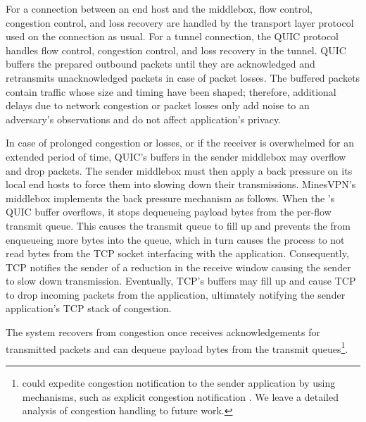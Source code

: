 For a connection between an end host and the middlebox, flow control, congestion
control, and loss recovery are handled by the transport layer protocol used on
the connection as usual.
%
For a tunnel connection, the QUIC protocol handles flow control, congestion
control, and loss recovery in
the tunnel.
QUIC buffers the prepared outbound packets until they are acknowledged and
retransmits unacknowledged packets in case of packet losses. The buffered
packets contain traffic whose size and timing have been shaped; therefore,
additional delays due to network congestion or packet losses only add noise to
an adversary’s observations and do not affect application’s privacy.

In case of prolonged congestion or losses, or if the receiver is overwhelmed for
an extended period of time, QUIC's buffers in the sender middlebox may overflow
and drop packets.
The sender middlebox must then apply a back pressure on its local end hosts to
force them into slowing down their transmissions. MinesVPN’s middlebox
implements the back pressure mechanism as follows. When the {\dshaper}'s QUIC
buffer overflows, it stops dequeueing payload bytes from the per-flow transmit
queue. This causes the transmit queue to fill up and prevents the {\ushaper}
from enqueueing more bytes into the queue, which in turn causes the {\ushaper}
process to not read bytes from the TCP socket interfacing with the application.
Consequently, TCP notifies the sender of a reduction in the receive window
causing the sender to slow down transmission. Eventually, TCP's buffers may fill
up and cause TCP to drop incoming packets from the application, ultimately
notifying the sender application's TCP stack of congestion.

The system recovers from congestion once {\dshaper} receives
acknowledgements for transmitted packets and can dequeue payload
bytes from the transmit queues\footnote{{\sys} could expedite congestion
notification to the sender application by using mechanisms, such as explicit
congestion notification \cite{ecn}. We leave a detailed analysis of congestion
handling to future work.}.

